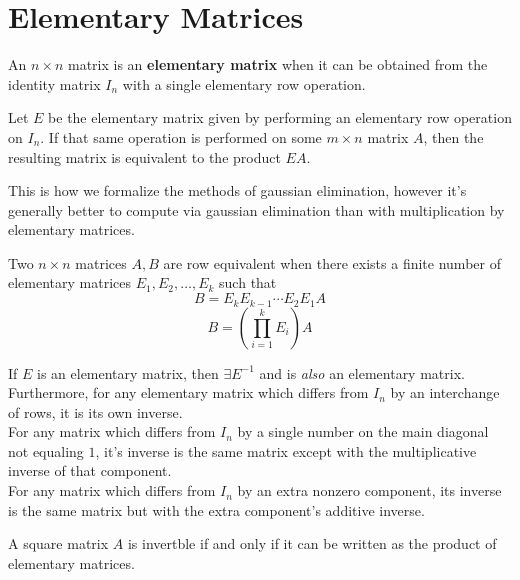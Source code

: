 \section{Elementary Matrices}
\begin{definition}
    An \(n\times n\) matrix is an \textbf{elementary matrix} when it can be obtained from the identity matrix \(I_n\) with a single elementary row operation.
\end{definition}
\begin{theorem}
    Let \(E\) be the elementary matrix given by performing an elementary row operation on \(I_n\). If that same operation is performed on some \(m\times n\) matrix \(A\), then the resulting matrix is equivalent to the product \(EA\).
\end{theorem}
\begin{remark}
    This is how we formalize the methods of gaussian elimination, however it's generally better to compute via gaussian elimination than with multiplication by elementary matrices.
\end{remark}
\begin{definition}
    Two \(n\times n\) matrices \(A,B\) are row equivalent when there exists a finite number of elementary matrices \(E_1,E_2,\ldots,E_k\) such that
    \[
        B=E_kE_{k-1}\cdots E_2 E_1 A
    \]
    \[
        B=\left( \prod_{i=1}^k E_i \right) A
    \]
\end{definition}
\begin{theorem}
    If \(E\) is an elementary matrix, then \(\exists E^{-1} \) and is \emph{also} an elementary matrix.\\
    Furthermore, for any elementary matrix which differs from \(I_n\) by an interchange of rows, it is its own inverse.\\
    For any matrix which differs from \(I_n\) by a single number on the main diagonal not equaling \(1\), it's inverse is the same matrix except with the multiplicative inverse of that component.\\
    For any matrix which differs from \(I_n\) by an extra nonzero component, its inverse is the same matrix but with the extra component's additive inverse.
\end{theorem}
\begin{theorem}
    A square matrix \(A\) is invertble if and only if it can be written as the product of elementary matrices.
\end{theorem}
